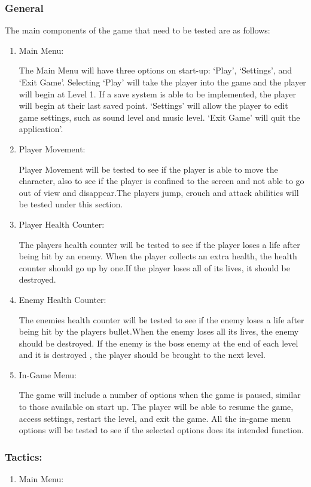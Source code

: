 \documentclass{article}
\begin{document}
\subsubsection{General}
The main components of the game that need to be tested are as follows:
\begin{enumerate}
    \item Main Menu:
    
    The Main Menu will have three options on start-up: ‘Play’, ‘Settings’, and ‘Exit Game’.
    Selecting ‘Play’ will take the player into the game and the player will begin at Level 1.
    If a save system is able to be implemented, the player will begin at their last saved
    point. ‘Settings’ will allow the player to edit game settings, such as sound level and
    music level. ‘Exit Game’ will quit the application’.
    \item Player Movement:
    
    Player Movement will be tested to see if the player is able to move the character, also to see if the player is confined to the screen and not able to go out of view and disappear.The players jump, crouch and attack abilities will be tested under this section.
    \item Player Health Counter:
    
    The players health counter will be tested to see if the player loses a life after being hit by an enemy. When the player collects an extra health, the health counter should go up by one.If the player loses all of its lives, it should be destroyed.
    \item Enemy Health Counter:
    
    The enemies health counter will be tested to see if the enemy loses a life after being hit by the players bullet.When the enemy loses all its lives, the enemy should be destroyed. If the enemy is the boss enemy at the end of each level and it is destroyed , the player should be brought to the next level.
    \item In-Game Menu:
    
    The game will include a number of options when the game is paused, similar to those
    available on start up. The player will be able to resume the game, access settings,
    restart the level, and exit the game. All the in-game menu options will be tested to see if the selected options does its intended function.
    
\end{enumerate}

\subsubsection{Tactics:}
\begin{enumerate}
    \item Main Menu:
    
    
\end{enumerate}
\end{document}
